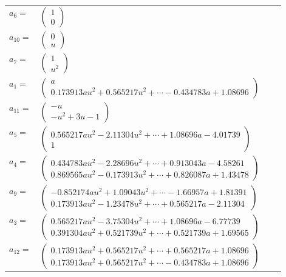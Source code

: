 \documentclass[1p]{elsarticle_modified}
\theoremstyle{definition}
\begin{document}
\begin{tabular}{m{7pt} m{180pt} m{7pt} m{180pt} }
\flushright $a_{6}=$&$\begin{pmatrix}1\\0\end{pmatrix}$ \\
\flushright $a_{10}=$&$\begin{pmatrix}0\\u\end{pmatrix}$ \\
\flushright $a_{7}=$&$\begin{pmatrix}1\\u^2\end{pmatrix}$ \\
\flushright $a_{1}=$&$\begin{pmatrix}a\\0.173913 a u^{2}+0.565217 u^{2}+\cdots-0.434783 a+1.08696\end{pmatrix}$ \\
\flushright $a_{11}=$&$\begin{pmatrix}- u\\- u^2+3 u-1\end{pmatrix}$ \\
\flushright $a_{5}=$&$\begin{pmatrix}0.565217 a u^{2}-2.11304 u^{2}+\cdots+1.08696 a-4.01739\\1\end{pmatrix}$ \\
\flushright $a_{4}=$&$\begin{pmatrix}0.434783 a u^{2}-2.28696 u^{2}+\cdots+0.913043 a-4.58261\\0.869565 a u^{2}-0.173913 u^{2}+\cdots+0.826087 a+1.43478\end{pmatrix}$ \\
\flushright $a_{9}=$&$\begin{pmatrix}-0.852174 a u^{2}+1.09043 u^{2}+\cdots-1.66957 a+1.81391\\0.173913 a u^{2}-1.23478 u^{2}+\cdots+0.565217 a-2.11304\end{pmatrix}$ \\
\flushright $a_{3}=$&$\begin{pmatrix}0.565217 a u^{2}-3.75304 u^{2}+\cdots+1.08696 a-6.77739\\0.391304 a u^{2}+0.521739 u^{2}+\cdots+0.521739 a+1.69565\end{pmatrix}$ \\
\flushright $a_{12}=$&$\begin{pmatrix}0.173913 a u^{2}+0.565217 u^{2}+\cdots+0.565217 a+1.08696\\0.173913 a u^{2}+0.565217 u^{2}+\cdots-0.434783 a+1.08696\end{pmatrix}$ \\

\end{tabular}
\end{document}
